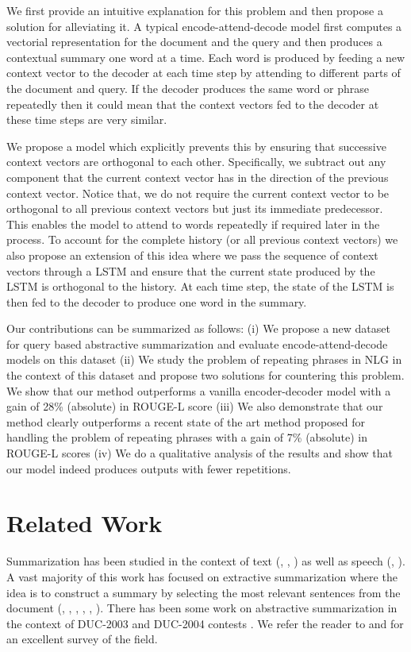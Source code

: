 \documentclass[11pt]{article}
\begin{document}
We first provide an intuitive explanation for this problem and then propose a solution for alleviating it. A typical encode-attend-decode model first computes a vectorial representation for the document and the query and then produces a contextual summary one word at a time. Each word is produced by feeding a new context vector to the decoder at each time step by attending to different parts of the document and query. If the decoder produces the same word or phrase repeatedly then it could mean that the context vectors fed to the decoder at these time steps are very similar. 


We propose a model which explicitly prevents this by ensuring that successive context vectors are orthogonal to each other. Specifically, we subtract out any component that the current context vector has in the direction of the previous context vector. Notice that, we do not require the current context vector to be orthogonal to all previous context vectors but just its immediate predecessor. This enables the model to attend to words repeatedly if required later in the process. To account for the complete history (or all previous context vectors) we also propose an extension of this idea where we pass the sequence of context vectors through a LSTM \cite{hochreiter1997long} and ensure that the current state produced by the LSTM is orthogonal to the history. At each time step, the state of the LSTM is then fed to the decoder to produce one word in the summary. 

Our contributions can be summarized as follows: (i) We propose a new dataset for query based abstractive summarization and evaluate encode-attend-decode models on this dataset (ii) We study the problem of repeating phrases in NLG in the context of this dataset and propose two solutions for countering this problem. We show that our method outperforms a vanilla encoder-decoder model with a gain of 28\% (absolute) in ROUGE-L score (iii) We also demonstrate that our method clearly outperforms a recent state of the art method proposed for handling the problem of repeating phrases with a gain of 7\% (absolute) in ROUGE-L scores (iv) We do a qualitative analysis of the results and show that our model indeed produces outputs with fewer repetitions.

\section{Related Work}
Summarization has been studied in the context of text (\cite{mani2001automatic}, \cite{das2007survey}, \cite{nenkova2012survey}) as well as speech (\cite{zhu2006comparing}, \cite{zhu2009summarizing}). A vast majority of this work has focused on extractive summarization where the idea is to construct a summary by selecting the most relevant sentences from the document (\cite{neto2002automatic}, \cite{erkan2004lexrank}, \cite{filippova2013overcoming}, \cite{colmenares2015heads}, \cite{riedhammer2010long}, \cite{ribeiro2013self}). There has been some work on abstractive summarization in the context of DUC-2003 and DUC-2004 contests \cite{zajic2004bbn}. We refer the reader to \cite{das2007survey} and \cite{nenkova2012survey} for an excellent survey of the field.
\end{document}
